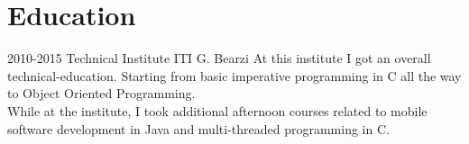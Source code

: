 \section*{Education}
\begin{entrylist}
  \entry
    {2010-2015}
    {Technical Institute}
    {ITI G. Bearzi}
    {At this institute I got an overall technical-education. Starting from basic imperative programming in C all the way to Object Oriented Programming.\\
    While at the institute, I took additional afternoon courses related to mobile software development in Java and multi-threaded programming in C.}
\end{entrylist}
